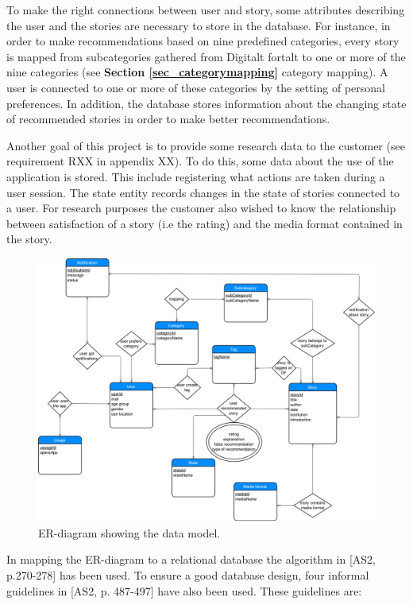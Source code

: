 To make the right connections between user and story, some attributes describing the user and the stories are necessary to store in the database. For instance, in order to make recommendations based on nine predefined categories, every story is mapped from subcategories gathered from Digitalt fortalt to one or more of the nine categories (see \textbf{Section \ref{sec_categorymapping}} category mapping). A user is connected to one or more of these categories by the setting of personal preferences. In addition, the database stores information about the changing state of recommended stories in order to make better recommendations. \newline

Another goal of this project is to provide some research data to the customer (see requirement RXX in appendix XX). To do this, some data about the use of the application is stored. This include registering what actions are taken during a user session. The state entity records changes in the state of stories connected to a user. For research purposes the customer also wished to know the relationship between satisfaction of a story (i.e the rating) and the media format contained in the story.

\begin{figure}[h!]
	\centering
	\includegraphics[width=\textwidth]{fig/er_diagram}
	\caption{ER-diagram showing the data model.}
	\label{er_diagram}
\end{figure}

In mapping the ER-diagram to a relational database the algorithm in [AS2, p.270-278] has been used. To ensure a good database design, four informal guidelines in [AS2, p. 487-497] have also been used. These guidelines are:

